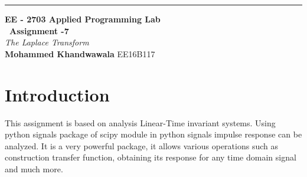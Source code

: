 \documentclass[a4paper]{article}
\begin{document}
\begin{titlepage}
	\raggedleft
	\rule{1pt}{\textheight} 
	\hspace{0.05\textwidth} 
	\parbox[b]{0.75\textwidth}{		
		{\LARGE\bfseries EE - 2703 Applied Programming Lab \\[0.5\baselineskip]  ~\huge Assignment -7}\\[2\baselineskip] 
		{\large\textit{The Laplace Transform}}\\[4\baselineskip] 
		{\Large\textbf{Mohammed Khandwawala}}
        \large EE16B117
		\vspace{0.5\textheight}  
	}

\end{titlepage}


\tableofcontents


\section{Introduction}
This assignment is based on analysis Linear-Time invariant systems. Using python signals package of scipy module in python signals impulse response can be analyzed. It is a very powerful package, it allows various operations such as construction transfer function, obtaining its response for any time domain signal and much more.  
\end{document}

